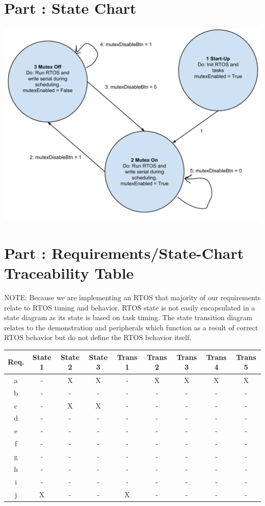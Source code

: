 \documentclass{article}
\newcounter{partNum}
\newcommand{\partNum}{%
        \stepcounter{partNum}%
        \thepartNum}
\newcommand{\sectPart}[1]{\section*{Part \partNum: #1}}
\begin{document}

\sectPart{State Chart}

\includegraphics[scale=.5]{RTOS_State_Chart.pdf}

\sectPart{Requirements/State-Chart Traceability Table}

NOTE: Because we are implementing an RTOS that majority of our requirements relate to RTOS timing and behavior. RTOS state is not easily encapsulated in a state diagram as its state is based on task timing. The state transition diagram relates to the demonstration and peripherals which function as a result of correct RTOS behavior but do not define the RTOS behavior itself.

\vspace*{1em}

\begin{tabular}{c | c | c | c | c | c | c | c | c}
Req. & State 1 & State 2 & State 3 & Trans 1 & Trans 2 & Trans 3 & Trans 4 & Trans 5 \\ \hline
a & - & X & X & - & X & X & X & X \\
b & - & - & - & - & - & - & - & - \\
c & - & X & X & - & - & - & - & - \\
d & - & - & - & - & - & - & - & - \\
e & - & - & - & - & - & - & - & - \\
f & - & - & - & - & - & - & - & - \\
g & - & - & - & - & - & - & - & - \\
h & - & - & - & - & - & - & - & - \\
i & - & - & - & - & - & - & - & - \\
j & X & - & - & X & - & - & - & - \\
\end{tabular}
\end{document}

